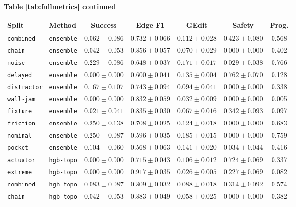\documentclass{article}
\begin{document}
\begin{center}
\textbf{Table \ref{tab:fullmetrics} continued}\\[0.4ex]
\begin{tabular}{llccccc}
\toprule
Split & Method & Success & Edge F1 & GEdit & Safety & Prog. \\
\midrule
\texttt{combined} & \texttt{ensemble} & $0.062 \pm 0.086$ & $0.732 \pm 0.066$ & $0.112 \pm 0.028$ & $0.423 \pm 0.080$ & 0.568 \\
\texttt{chain} & \texttt{ensemble} & $0.042 \pm 0.053$ & $0.856 \pm 0.057$ & $0.070 \pm 0.029$ & $0.000 \pm 0.000$ & 0.402 \\
\texttt{noise} & \texttt{ensemble} & $0.229 \pm 0.086$ & $0.648 \pm 0.037$ & $0.171 \pm 0.017$ & $0.029 \pm 0.038$ & 0.766 \\
\texttt{delayed} & \texttt{ensemble} & $0.000 \pm 0.000$ & $0.600 \pm 0.041$ & $0.135 \pm 0.004$ & $0.762 \pm 0.070$ & 0.128 \\
\texttt{distractor} & \texttt{ensemble} & $0.167 \pm 0.107$ & $0.743 \pm 0.094$ & $0.094 \pm 0.041$ & $0.000 \pm 0.000$ & 0.338 \\
\texttt{wall-jam} & \texttt{ensemble} & $0.000 \pm 0.000$ & $0.832 \pm 0.059$ & $0.032 \pm 0.009$ & $0.000 \pm 0.000$ & 0.005 \\
\texttt{fixture} & \texttt{ensemble} & $0.021 \pm 0.041$ & $0.835 \pm 0.030$ & $0.067 \pm 0.016$ & $0.342 \pm 0.093$ & 0.097 \\
\texttt{friction} & \texttt{ensemble} & $0.250 \pm 0.138$ & $0.708 \pm 0.025$ & $0.124 \pm 0.018$ & $0.000 \pm 0.000$ & 0.683 \\
\texttt{nominal} & \texttt{ensemble} & $0.250 \pm 0.087$ & $0.596 \pm 0.035$ & $0.185 \pm 0.015$ & $0.000 \pm 0.000$ & 0.759 \\
\texttt{pocket} & \texttt{ensemble} & $0.104 \pm 0.060$ & $0.568 \pm 0.063$ & $0.141 \pm 0.020$ & $0.034 \pm 0.044$ & 0.416 \\
\texttt{actuator} & \texttt{hgb-topo} & $0.000 \pm 0.000$ & $0.715 \pm 0.043$ & $0.106 \pm 0.012$ & $0.724 \pm 0.069$ & 0.337 \\
\texttt{extreme} & \texttt{hgb-topo} & $0.000 \pm 0.000$ & $0.917 \pm 0.035$ & $0.026 \pm 0.005$ & $0.227 \pm 0.069$ & 0.082 \\
\texttt{combined} & \texttt{hgb-topo} & $0.083 \pm 0.087$ & $0.809 \pm 0.032$ & $0.088 \pm 0.018$ & $0.314 \pm 0.092$ & 0.574 \\
\texttt{chain} & \texttt{hgb-topo} & $0.042 \pm 0.053$ & $0.883 \pm 0.049$ & $0.058 \pm 0.025$ & $0.000 \pm 0.000$ & 0.382 \\

\end{tabular}
\end{center}
\end{document}
